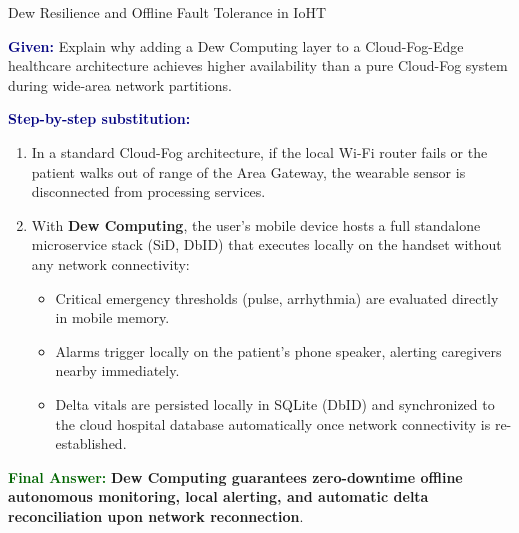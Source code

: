 \documentclass[11pt,a4paper,openany]{report}
\newcommand{\Given}{\par\textbf{\textcolor{navy}{Given:}} }
\newcommand{\Steps}{\par\textbf{\textcolor{navy}{Step-by-step substitution:}}\par}
\newcommand{\Answer}{\par\textbf{\textcolor{darkgreen}{Final Answer:}} }
\begin{document}
\begin{solved}{Dew Resilience and Offline Fault Tolerance in IoHT}
\Given Explain why adding a Dew Computing layer to a Cloud-Fog-Edge healthcare architecture achieves higher availability than a pure Cloud-Fog system during wide-area network partitions.
\Steps
\begin{enumerate}[leftmargin=*]
  \item In a standard Cloud-Fog architecture, if the local Wi-Fi router fails or the patient walks out of range of the Area Gateway, the wearable sensor is disconnected from processing services.
  \item With \textbf{Dew Computing}, the user's mobile device hosts a full standalone microservice stack (SiD, DbID) that executes locally on the handset without any network connectivity:
    \begin{itemize}
      \item Critical emergency thresholds (pulse, arrhythmia) are evaluated directly in mobile memory.
      \item Alarms trigger locally on the patient's phone speaker, alerting caregivers nearby immediately.
      \item Delta vitals are persisted locally in SQLite (DbID) and synchronized to the cloud hospital database automatically once network connectivity is re-established.
    \end{itemize}
\end{enumerate}
\Answer \textbf{Dew Computing guarantees zero-downtime offline autonomous monitoring, local alerting, and automatic delta reconciliation upon network reconnection}.
\end{solved}
\end{document}
